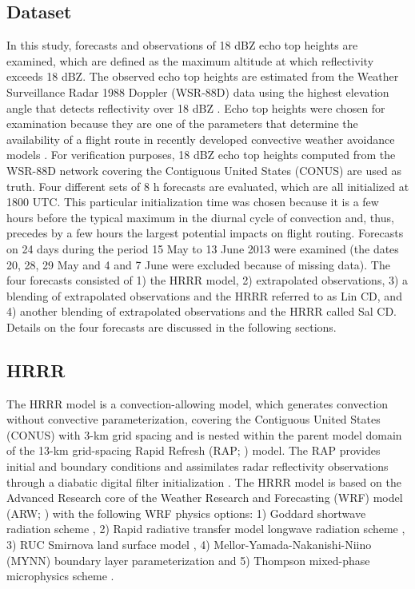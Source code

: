 \documentclass[12pt]{article}
\begin{document}
\subsection{Dataset}
In this study, forecasts and observations of 18 dBZ echo top heights are examined, which are defined as the maximum altitude at which reflectivity exceeds 18 dBZ. The observed echo top heights are estimated from the Weather Surveillance Radar 1988 Doppler (WSR-88D) data using the highest elevation angle that detects reflectivity over 18 dBZ \citep{lak++13}. Echo top heights were chosen for examination because they  are one of the parameters that determine the availability of a flight route in recently developed convective weather avoidance models \citep{mat+10, sheth++13}. For verification purposes, 18 dBZ echo top heights computed from the WSR-88D network covering the Contiguous United States (CONUS) are used as truth. Four different sets of 8 h forecasts are evaluated, which are all initialized at 1800 UTC. This particular initialization time was chosen because it is a few hours before the typical maximum in the diurnal cycle of convection and, thus, precedes by a few hours the largest potential impacts on flight routing. Forecasts on 24 days during the period 15 May to 13 June 2013 were examined (the dates 20, 28, 29 May and 4 and 7 June were excluded because of missing data). The four forecasts consisted of 1) the HRRR model, 2) extrapolated observations, 3) a blending of extrapolated observations and the HRRR referred to as Lin CD, and 4) another blending of extrapolated observations and the HRRR called Sal CD. Details on the four forecasts are discussed in the following sections. 
\subsection{HRRR}
The HRRR model is a convection-allowing model, which generates convection without convective parameterization, covering the Contiguous United States (CONUS) with 3-km grid spacing and is nested within the parent model domain of the 13-km grid-spacing Rapid Refresh (RAP; \citealt{brown++11, wey++11}) model. The RAP provides initial and boundary conditions and assimilates radar reflectivity observations through a diabatic digital filter initialization \citep{huang+93}. The HRRR model is based on the Advanced Research core of the Weather Research and Forecasting (WRF) model (ARW; \citealt{skam++08}) with the following WRF physics options: 
1) Goddard shortwave radiation scheme \citep{chou94}, 
2) Rapid radiative transfer model longwave radiation scheme \citep{mlawer++97}, 
3) RUC Smirnova land surface model \citep{smirnova++97}, 
4) Mellor-Yamada-Nakanishi-Niino (MYNN) boundary layer parameterization \citep{nakanishi04} 
and 5) Thompson mixed-phase microphysics scheme \citep{thompson++08}.
\end{document}
